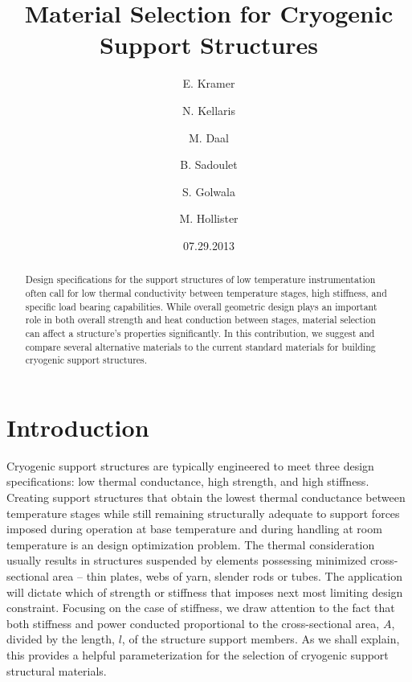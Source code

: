 \documentclass[final]{svjour2}
\begin{document}
\newcommand{\hdblarrow}{H\makebox[0.9ex][l]{$\downdownarrows$}-}
\title{Material Selection for Cryogenic Support Structures}

\author{E. Kramer \and N. Kellaris  \and M. Daal  \and B. Sadoulet \and S. Golwala \and M. Hollister}


\date{07.29.2013}

\maketitle

\begin{abstract}

Design specifications for the support structures of low temperature instrumentation often call for low thermal conductivity between temperature stages, high stiffness, and specific load bearing capabilities.  While overall geometric design plays an important role in both overall strength and heat conduction between stages, material selection can affect a structure's properties significantly.  In this contribution, we suggest and compare several alternative materials to the current standard materials for building cryogenic support structures.


\end{abstract}

\section{Introduction}
Cryogenic support structures are typically engineered to meet three design specifications: low thermal conductance, high strength, and high stiffness. Creating support structures that obtain the lowest thermal conductance between temperature stages while still remaining structurally adequate to support forces imposed during operation at base temperature and during handling at room temperature is an design optimization problem. The thermal consideration usually results in structures suspended by elements possessing minimized cross-sectional area -- thin plates, webs of yarn, slender rods or tubes. The application will dictate which of strength or stiffness that imposes next most limiting design constraint. Focusing on the case of stiffness, we draw attention to the fact that both stiffness and power conducted proportional to the cross-sectional area, $A$, divided by the length, $l$, of the structure support members.\cite{Hastings1993} As we shall explain, this provides a helpful parameterization for the selection of cryogenic support structural materials.
\end{document}
